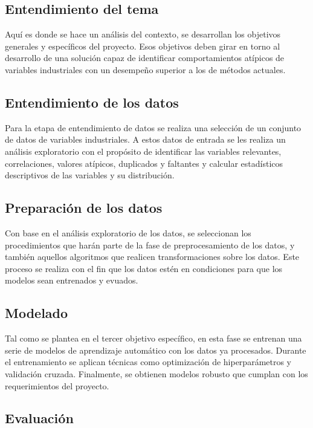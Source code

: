 \documentclass[11pt,a4paper,spanish]{book}
\numberwithin{equation}{chapter}
\numberwithin{figure}{chapter}
\begin{document}
\subsection{Entendimiento del tema}


Aquí es donde se hace un análisis del contexto, se desarrollan los objetivos generales 
y específicos del proyecto. Esos objetivos deben girar en torno al desarrollo de una 
solución capaz de identificar comportamientos atípicos de variables industriales con un 
desempeño superior a los de métodos actuales.


\subsection{Entendimiento de los datos}


Para la etapa de entendimiento de datos se realiza una selección de un conjunto de datos
de variables industriales. A estos datos de entrada se 
les realiza un análisis exploratorio con el propósito de identificar las variables 
relevantes, correlaciones, valores atípicos, duplicados y faltantes y calcular 
estadísticos descriptivos de las variables y su distribución.


\subsection{Preparación de los datos}


Con base en el análisis exploratorio de los datos, se seleccionan los procedimientos 
que harán parte de la fase de preprocesamiento de los datos, y también aquellos 
algoritmos que realicen transformaciones sobre los datos. Este proceso se realiza con el fin 
que los datos estén en condiciones para que los modelos sean entrenados y evuados. 


\subsection{Modelado}


Tal como se plantea en el tercer objetivo específico, en esta fase se entrenan una serie 
de modelos de aprendizaje automático con los datos ya procesados. Durante el entrenamiento
se aplican técnicas como optimización de hiperparámetros y validación cruzada. 
Finalmente, se obtienen modelos robusto que cumplan con los requerimientos del proyecto. 


\subsection{Evaluación}
\end{document}
